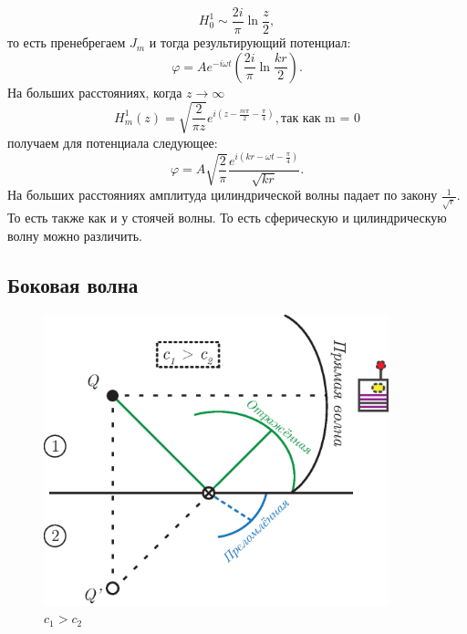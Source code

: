 \documentclass[14pt,a4paper,oneside]{extarticle}	%
\begin{document}
\begin{equation*}
H_{0}^{1} \sim \frac{2i}{\pi}\ln\frac{z}{2},
\end{equation*}
то есть пренебрегаем $ J_{m} $ и тогда результирующий потенциал:
 \begin{equation*}
 \varphi = Ae^{-i\omega t}\left( \frac{2i}{\pi}\ln\frac{kr}{2} \right).
 \end{equation*}
На больших расстояниях, когда $ z\longrightarrow \infty $
 \begin{equation*}
H_{m}^{1}(z) = \sqrt{\frac{2}{\pi z}}e^{i\left(z - \frac{m\pi}{2} - \frac{\pi}{4} \right) }, \text{так как m = 0}
\end{equation*}
получаем для потенциала следующее:
\begin{equation*}
\varphi = A\sqrt{\frac{2}{\pi}}\frac{e^{i\left(kr - \omega t - \frac{\pi}{4}\right) }}{\sqrt{kr}}.
\end{equation*}
На больших расстояниях амплитуда цилиндрической волны падает по закону  $ \frac{1}{\sqrt{r}} $. То есть также как и у стоячей волны. То есть сферическую и цилиндрическую волну можно различить.

\begin{center}
	\subsection*{Боковая волна} %
\end{center}

\begin{figure}[h!] 	%
	\centering 		%
	\includegraphics[width=10cm]{12.eps} %
	\caption{$ c_{1} > c_{2} $}
	\label{fig::13}
\end{figure}
\end{document}
